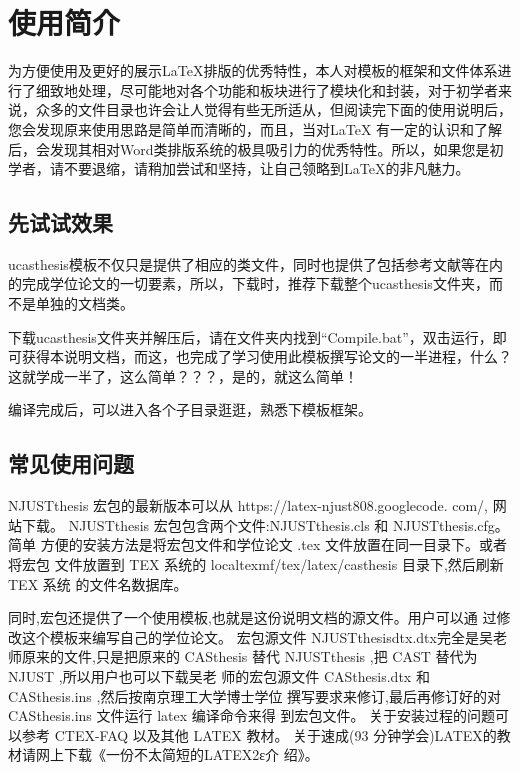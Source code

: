 
\chapter{使用简介}
\label{chap:guide}

为方便使用及更好的展示\LaTeX{}排版的优秀特性，本人对模板的框架和文件体系进行了细致地处理，尽可能地对各个功能和板块进行了模块化和封装，对于初学者来说，众多的文件目录也许会让人觉得有些无所适从，但阅读完下面的使用说明后，您会发现原来使用思路是简单而清晰的，而且，当对\LaTeX{} 有一定的认识和了解后，会发现其相对Word类排版系统的极具吸引力的优秀特性。所以，如果您是初学者，请不要退缩，请稍加尝试和坚持，让自己领略到\LaTeX{}的非凡魅力。

\section{先试试效果}

ucasthesis模板不仅只是提供了相应的类文件，同时也提供了包括参考文献等在内的完成学位论文的一切要素，所以，下载时，推荐下载整个ucasthesis文件夹，而不是单独的文档类。

下载ucasthesis文件夹并解压后，请在文件夹内找到“Compile.bat”，双击运行，即可获得本说明文档，而这，也完成了学习使用此模板撰写论文的一半进程，什么？这就学成一半了，这么简单？？？，是的，就这么简单！

编译完成后，可以进入各个子目录逛逛，熟悉下模板框架。

\section{常见使用问题}

NJUSTthesis 宏包的最新版本可以从 https://latex-njust808.googlecode. com/, 网站下载。
NJUSTthesis 宏包包含两个文件:NJUSTthesis.cls 和 NJUSTthesis.cfg。简单 方便的安装方法是将宏包文件和学位论文 .tex 文件放置在同一目录下。或者将宏包 文件放置到 TEX 系统的 localtexmf/tex/latex/casthesis 目录下,然后刷新 TEX 系统 的文件名数据库。

同时,宏包还提供了一个使用模板,也就是这份说明文档的源文件。用户可以通 过修改这个模板来编写自己的学位论文。
宏包源文件 NJUSTthesisdtx.dtx完全是吴老师原来的文件,只是把原来的 CASthesis 替代 NJUSTthesis ,把 CAST 替代为 NJUST ,所以用户也可以下载吴老 师的宏包源文件 CASthesis.dtx 和 CASthesis.ins ,然后按南京理工大学博士学位 撰写要求来修订,最后再修订好的对 CASthesis.ins 文件运行 latex 编译命令来得 到宏包文件。
关于安装过程的问题可以参考 CTEX-FAQ 以及其他 LATEX 教材。 关于速成(93 分钟学会)LATEX的教材请网上下载《一份不太简短的LATEX2ε介
绍》。

